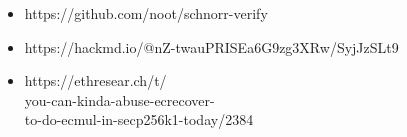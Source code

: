 \begin{itemize}
    \item https://github.com/noot/schnorr-verify
    \item https://hackmd.io/@nZ-twauPRISEa6G9zg3XRw/SyjJzSLt9
    \item https://ethresear.ch/t/ \\ you-can-kinda-abuse-ecrecover- \\ to-do-ecmul-in-secp256k1-today/2384
  \end{itemize}
